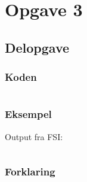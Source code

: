 \section{Opgave 3}
\subsection{Delopgave }\label{ass:1-}
\subsubsection{Koden}
\begin{lstlisting}[language=fsharp]

\end{lstlisting}

\subsubsection{Eksempel}
Output fra FSI:
\begin{lstlisting}

\end{lstlisting}

\subsubsection{Forklaring}


